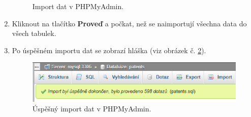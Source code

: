 \begin{enumerate}
\begin{figure}[H]
	\caption{Import dat v PHPMyAdmin.}
	\label{fig:mysqlimport}
	\end{figure}
\item Kliknout na tlačítko \textbf{Proveď} a počkat, než se naimportují všechna data do všech tabulek.
\item Po úspěšném importu dat se zobrazí hláška (viz obrázek č. \ref{fig:mysql_import_ok}).
	\begin{figure}[H]
	\centering
	\includegraphics[width=12cm]{img/manual/mysql_import_ok}
	\caption{Úspěšný import dat v PHPMyAdmin.}
	\label{fig:mysql_import_ok}
	\end{figure}
\end{enumerate}

\newpage
